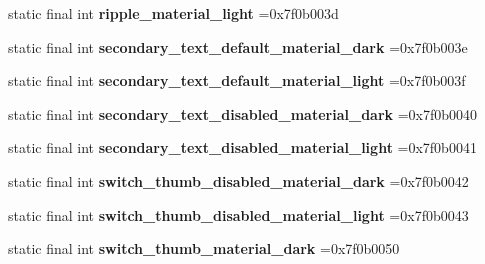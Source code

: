 \begin{DoxyCompactItemize}
\item 
\hypertarget{classcheck_1_1test_1_1_r_1_1color_a13a03f20b804cb2811f889d8750669ee}{}static final int {\bfseries ripple\+\_\+material\+\_\+light} =0x7f0b003d\label{classcheck_1_1test_1_1_r_1_1color_a13a03f20b804cb2811f889d8750669ee}

\item 
\hypertarget{classcheck_1_1test_1_1_r_1_1color_a7009c8da62028d85e02a17a41be16cc8}{}static final int {\bfseries secondary\+\_\+text\+\_\+default\+\_\+material\+\_\+dark} =0x7f0b003e\label{classcheck_1_1test_1_1_r_1_1color_a7009c8da62028d85e02a17a41be16cc8}

\item 
\hypertarget{classcheck_1_1test_1_1_r_1_1color_a86ff0e7b16d0c1bb8e5925a1a3e41c55}{}static final int {\bfseries secondary\+\_\+text\+\_\+default\+\_\+material\+\_\+light} =0x7f0b003f\label{classcheck_1_1test_1_1_r_1_1color_a86ff0e7b16d0c1bb8e5925a1a3e41c55}

\item 
\hypertarget{classcheck_1_1test_1_1_r_1_1color_a1dfb1a01ebe554b5984a3368886d238d}{}static final int {\bfseries secondary\+\_\+text\+\_\+disabled\+\_\+material\+\_\+dark} =0x7f0b0040\label{classcheck_1_1test_1_1_r_1_1color_a1dfb1a01ebe554b5984a3368886d238d}

\item 
\hypertarget{classcheck_1_1test_1_1_r_1_1color_abf1b2f50e5787ea9e884842582f91414}{}static final int {\bfseries secondary\+\_\+text\+\_\+disabled\+\_\+material\+\_\+light} =0x7f0b0041\label{classcheck_1_1test_1_1_r_1_1color_abf1b2f50e5787ea9e884842582f91414}

\item 
\hypertarget{classcheck_1_1test_1_1_r_1_1color_a70070da1bf7738d0ac574e6f1421a811}{}static final int {\bfseries switch\+\_\+thumb\+\_\+disabled\+\_\+material\+\_\+dark} =0x7f0b0042\label{classcheck_1_1test_1_1_r_1_1color_a70070da1bf7738d0ac574e6f1421a811}

\item 
\hypertarget{classcheck_1_1test_1_1_r_1_1color_a6a2be9c71d056efeb28d85cebfd47f50}{}static final int {\bfseries switch\+\_\+thumb\+\_\+disabled\+\_\+material\+\_\+light} =0x7f0b0043\label{classcheck_1_1test_1_1_r_1_1color_a6a2be9c71d056efeb28d85cebfd47f50}

\item 
\hypertarget{classcheck_1_1test_1_1_r_1_1color_add3bee02ae88ea1a63bfdcfee0f2b133}{}static final int {\bfseries switch\+\_\+thumb\+\_\+material\+\_\+dark} =0x7f0b0050\label{classcheck_1_1test_1_1_r_1_1color_add3bee02ae88ea1a63bfdcfee0f2b133}


\end{DoxyCompactItemize}
